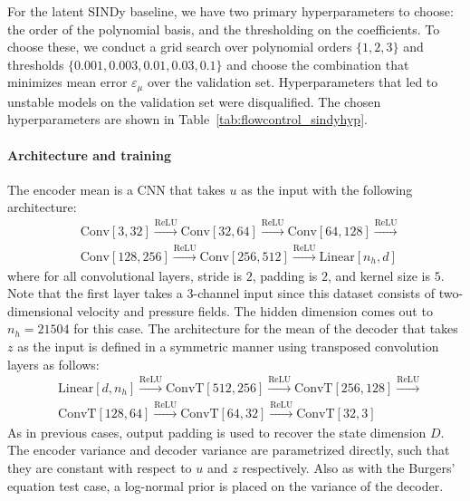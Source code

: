 \documentclass{article}
\begin{document}
	For the latent SINDy baseline, we have two primary hyperparameters to choose: the order of the polynomial basis, and the thresholding on the coefficients. To choose these, we conduct a grid search over polynomial orders $\{1, 2, 3\}$ and thresholds $\{0.001, 0.003, 0.01, 0.03, 0.1\}$ and choose the combination that minimizes mean error $\varepsilon_\mu$ over the validation set. Hyperparameters that led to unstable models on the validation set were disqualified. The chosen hyperparameters are shown in Table~\ref{tab:flowcontrol_sindyhyp}.
	
	\paragraph{Architecture and training}
	
	The encoder mean is a CNN that takes ${u}$ as the input with the following architecture:
	\begin{equation*}
		\begin{aligned}
			& \textrm{Conv}[3, 32] \xrightarrow{\text{ReLU}} \textrm{Conv}[32, 64] \xrightarrow{\text{ReLU}} \textrm{Conv}[64, 128] \xrightarrow{\text{ReLU}} \\
			& \textrm{Conv}[128, 256] \xrightarrow{\text{ReLU}} \textrm{Conv}[256, 512] \xrightarrow{\text{ReLU}} \textrm{Linear}[n_h, d]
		\end{aligned}
	\end{equation*}
	where for all convolutional layers, stride is $2$, padding is $2$, and kernel size is $5$. Note that the first layer takes a $3$-channel input since this dataset consists of two-dimensional velocity and pressure fields. The hidden dimension comes out to $n_h = 21504$ for this case. The architecture for the mean of the decoder that takes $z$ as the input is defined in a symmetric manner using transposed convolution layers as follows:
	\begin{equation*}
		\begin{aligned}
			& \textrm{Linear}[d, n_h] \xrightarrow{\text{ReLU}} \textrm{ConvT}[512, 256] \xrightarrow{\text{ReLU}} \textrm{ConvT}[256, 128] \xrightarrow{\text{ReLU}} \\
			& \textrm{ConvT}[128, 64] \xrightarrow{\text{ReLU}} \textrm{ConvT}[64, 32] \xrightarrow{\text{ReLU}} \textrm{ConvT}[32, 3]
		\end{aligned}
	\end{equation*}
	As in previous cases, output padding is used to recover the state dimension $D$. The encoder variance and decoder variance are parametrized directly, such that they are constant with respect to $u$ and $z$ respectively. Also as with the Burgers' equation test case, a log-normal prior is placed on the variance of the decoder.
	
\end{document}

